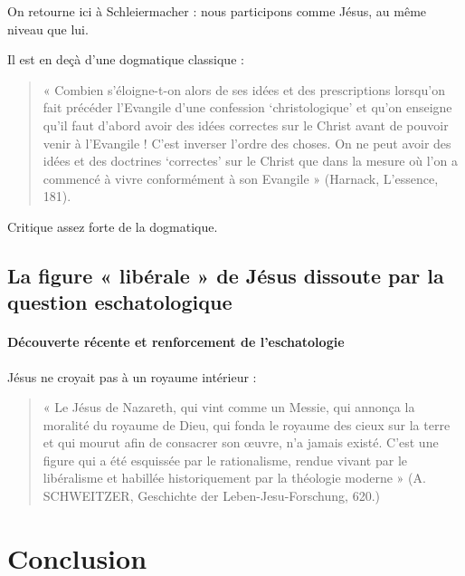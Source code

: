On retourne ici à Schleiermacher : nous participons comme Jésus, au même niveau que lui.  

Il est en deçà d'une dogmatique classique : 
\begin{quote}
    « Combien s’éloigne-t-on alors de ses idées et des prescriptions lorsqu’on fait précéder l’Evangile d’une confession ‘christologique’ et qu’on enseigne qu’il faut d’abord avoir des idées correctes sur le Christ avant de pouvoir venir à l’Evangile ! C’est inverser l’ordre des choses. On ne peut avoir des idées et des doctrines ‘correctes’ sur le Christ que dans la mesure où l’on a commencé à vivre conformément à son Evangile » (Harnack, L’essence, 181).
\end{quote}

Critique assez forte de la dogmatique.


\subsection{La figure « libérale » de Jésus dissoute par la question eschatologique}  

\paragraph{Découverte récente et renforcement de l'eschatologie} Jésus ne croyait pas à un royaume intérieur :

\begin{quote}
    « Le Jésus de Nazareth, qui vint comme un Messie, qui annonça la moralité du royaume de Dieu, qui fonda le royaume des cieux sur la terre et qui mourut afin de consacrer son œuvre, n’a jamais existé. C’est une figure qui a été esquissée par le rationalisme, rendue vivant par le libéralisme et habillée historiquement par la théologie moderne » (A. SCHWEITZER, Geschichte der Leben-Jesu-Forschung, 620.)
\end{quote}
\section{Conclusion}






 
